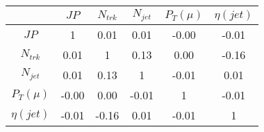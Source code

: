 \begin{tabular}{|c|c|c|c|c|c|} 
\hline
 & $JP$ & $N_{trk}$ & $N_{jet}$ & $P_{T} (\mu)$ & $\eta (jet)$ \\ \hline
$JP$ & 1 & 0.01 & 0.01 & -0.00 & -0.01 \\
$N_{trk}$ & 0.01 & 1 & 0.13 & 0.00 & -0.16 \\
$N_{jet}$ & 0.01 & 0.13 & 1 & -0.01 & 0.01 \\
$P_{T} (\mu)$ & -0.00 & 0.00 & -0.01 & 1 & -0.01 \\
$\eta (jet)$ & -0.01 & -0.16 & 0.01 & -0.01 & 1 \\
\hline 
\end{tabular} 


